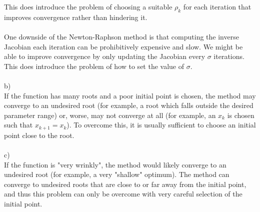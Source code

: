 \documentclass[10pt]{article}
\begin{document}
 This does introduce the problem of choosing a suitable $\rho_{k}$ for each iteration that improves convergence rather than hindering it.\\
 \\
 One downside of the Newton-Raphson method is that computing the inverse Jacobian each iteration can be prohibitively expensive and slow. We might be able to improve convergence by only updating the Jacobian every $\sigma$ iterations. This does introduce the problem of how to set the value of $\sigma$.\\
 \\
 b)\\
 If the function has many roots and a poor initial point is chosen, the method may converge to an undesired root (for example, a root which falls outside the desired parameter range) or, worse, may not converge at all (for example, an $x_{k}$ is chosen such that $x_{k+1} = x_{k}$). To overcome this, it is usually sufficient to choose an initial point close to the root.\\
\\
c)\\
If the function is "very wrinkly", the method would likely converge to an undesired root (for example, a very "shallow" optimum). The method can converge to undesired roots that are close to or far away from the initial point, and thus this problem can only be overcome with very careful selection of the initial point.
\end{document}
